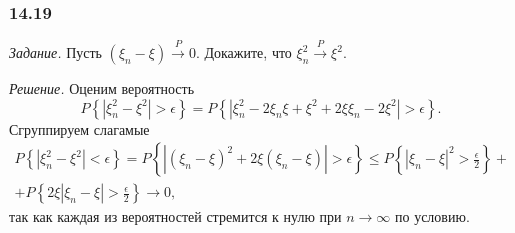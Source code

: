 \subsubsection*{14.19}

\textit{Задание.} Пусть $ \left( \xi_n - \xi \right) \overset{P}{ \rightarrow } 0$.
Докажите, что $ \xi_n^2 \overset{P}{ \rightarrow } \xi^2$.

\textit{Решение.} Оценим вероятность
$$P \left\{ \left| \xi_n^2 - \xi^2 \right| > \epsilon \right\} =
P \left\{ \left| \xi_n^2 - 2 \xi_n \xi + \xi^2 + 2 \xi \xi_n - 2 \xi^2 \right| > \epsilon \right\}.$$
Сгруппируем слагамые
\begin{equation*}
\begin{split}
P \left\{ \left| \xi_n^2 - \xi^2 \right| < \epsilon \right\} =
P \left\{ \left| \left( \xi_n - \xi \right)^2 + 2 \xi \left( \xi_n - \xi \right) \right| > \epsilon \right\} \leq
P \left\{ \left| \xi_n - \xi \right|^2 > \frac{ \epsilon }{2} \right\} + \\
+ P \left\{ 2 \xi \left| \xi_n - \xi \right| > \frac{ \epsilon }{2} \right\} \rightarrow
0,
\end{split}
\end{equation*}
так как каждая из вероятностей стремится к нулю при $n \rightarrow \infty $ по условию.
